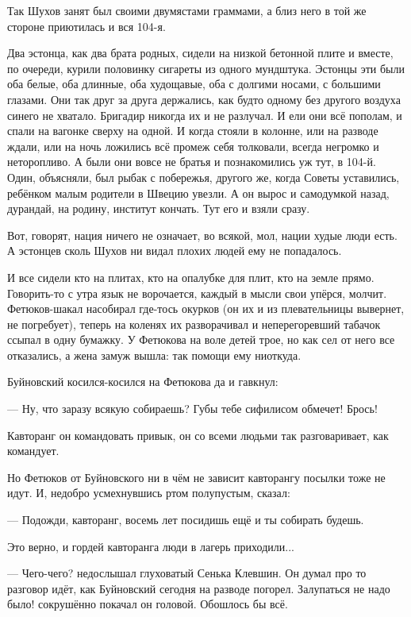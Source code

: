 Так Шухов занят был своими двумястами граммами, а близ него в той же стороне приютилась и вся
104-я.

Два эстонца, как два брата родных, сидели на низкой бетонной плите и вместе, по очереди,
курили половинку сигареты из одного мундштука. Эстонцы эти были оба белые, оба длинные, оба
худощавые, оба с долгими носами, с большими глазами. Они так друг за друга держались, как
будто одному без другого воздуха синего не хватало. Бригадир никогда их и не разлучал. И ели
они всё пополам, и спали на вагонке сверху на одной. И когда стояли в колонне, или на разводе
ждали, или на ночь ложились \dash всё промеж себя толковали, всегда негромко и неторопливо. А
были они вовсе не братья и познакомились уж тут, в 104-й. Один, объясняли, был рыбак с побережья,
другого же, когда Советы уставились, ребёнком малым родители в Швецию увезли. А он вырос и
самодумкой назад, дурандай, на родину, институт кончать. Тут его и взяли сразу.

Вот, говорят, нация ничего не означает, во всякой, мол, нации худые люди есть. А эстонцев сколь
Шухов ни видал \dash плохих людей ему не попадалось.

И все сидели \dash кто на плитах, кто на опалубке для плит, кто на земле прямо. Говорить-то с утра
язык не ворочается, каждый в мысли свои упёрся, молчит. Фетюков-шакал насобирал где-тось
окурков (он их и из плевательницы вывернет, не погребует), теперь на коленях их разворачивал
и неперегоревший табачок ссыпал в одну бумажку. У Фетюкова на воле детей трое, но как сел \dash
от него все отказались, а жена замуж вышла: так помощи ему ниоткуда.

Буйновский косился-косился на Фетюкова да и гавкнул:

--- Ну, что заразу всякую собираешь? Губы тебе сифилисом обмечет! Брось!

Кавторанг \dash он командовать привык, он со всеми людьми так разговаривает, как командует.

Но Фетюков от Буйновского ни в чём не зависит \dash кавторангу посылки тоже не идут. И, недобро
усмехнувшись ртом полупустым, сказал:

--- Подожди, кавторанг, восемь лет посидишь \dash ещё и ты собирать будешь.

Это верно, и гордей кавторанга люди в лагерь приходили...

--- Чего-чего? \dash недослышал глуховатый Сенька Клевшин. Он думал \dash про то разговор идёт, как
Буйновский сегодня на разводе погорел. \Dash Залупаться не надо было! \dash сокрушённо покачал он
головой. \Dash Обошлось бы всё.

